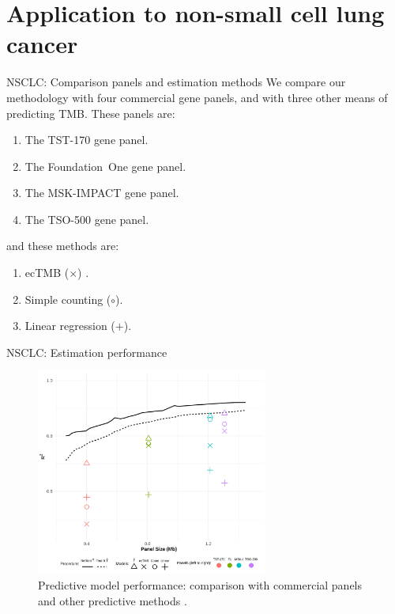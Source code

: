 \documentclass{beamer}
\begin{document}
\section{Application to non-small cell lung cancer}

\begin{frame}{NSCLC: Comparison panels and estimation methods}
We compare our methodology with four commercial gene panels, and with three other means of predicting TMB. These panels are:
\begin{enumerate}
\item The \color{red} TST-170 \color{black} gene panel.
\item The \color{green} Foundation~One \color{black} gene panel.
\item The \color{blue} MSK-IMPACT \color{black} gene panel.
\item The \color{purple} TSO-500 \color{black} gene panel.
\end{enumerate}
and these methods are:
\begin{enumerate}
    \item ecTMB  ($\times$) \citep{yao_ectmb_2020}.
    \item Simple counting ($\circ$).
    \item Linear regression ($+$).
\end{enumerate}

\end{frame}




\begin{frame}{NSCLC: Estimation performance}

\begin{figure}[htbp]
\centering
\includegraphics[width=3in]{../results/figures/originalpanelcomparison.png}
\caption{Predictive model performance: comparison with commercial panels and other predictive methods \citep{bradley_data-driven_2021, yao_ectmb_2020}. \label{fig:7}}
\end{figure}
\end{frame}
\end{document}
